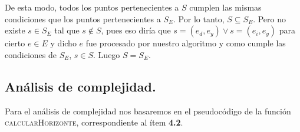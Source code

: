 De esta modo, todos los puntos pertenecientes a $S$ cumplen las mismas
condiciones que los puntos pertenecientes a $S_E$. Por lo tanto, $S
\subseteq S_E$. Pero no existe $s \in S_E$ tal que $s \notin S$, pues eso
diría que $s = (e_d, e_y) \lor s = (e_i, e_y)$ para cierto $e \in E$ y dicho
$e$ fue procesado por nuestro algoritmo y como cumple las condiciones de
$S_E$, $s \in S$. Luego $S = S_E$.


\subsection{Análisis de complejidad.}

\vspace*{0.3cm}
 
Para el análisis de complejidad nos basaremos en el pseudocódigo de la función
\textsc{calcularHorizonte}, correspondiente al ítem \textbf{4.2}.
 
